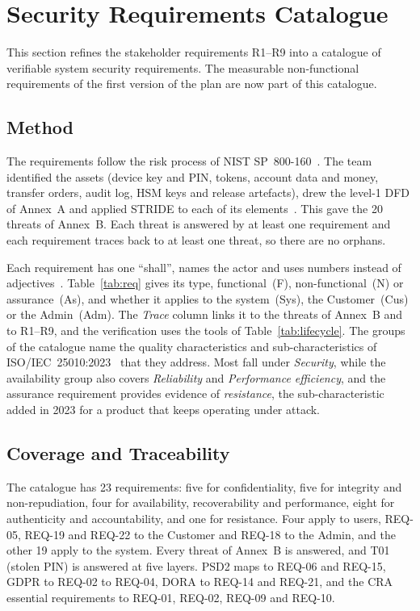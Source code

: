 \section{Security Requirements Catalogue}
\label{sec:catalogue}

This section refines the stakeholder requirements R1--R9 into a catalogue
of verifiable system security requirements. The measurable
non-functional requirements of the first version of the plan are now
part of this catalogue.

\subsection{Method}

The requirements follow the risk process of NIST SP~800-160~\cite{nist800160v1}.
The team identified the assets (device key and \ac{PIN}, tokens, account
data and money, transfer orders, audit log, \ac{HSM} keys and release
artefacts), drew the level-1 \ac{DFD} of Annex~A and applied \ac{STRIDE}
to each of its elements~\cite{shostack2014}. This gave the 20 threats of
Annex~B. Each threat is answered by at least one requirement and each
requirement traces back to at least one threat, so there are no orphans.

Each requirement has one ``shall'', names the actor and uses numbers
instead of adjectives~\cite{hooks1993}. Table~\ref{tab:req} gives its
type, functional~(F), non-functional~(N) or assurance~(As), and whether
it applies to the system~(Sys), the Customer~(Cus) or the Admin~(Adm).
The \emph{Trace} column links it to the threats of Annex~B and to R1--R9,
and the verification uses the tools of Table~\ref{tab:lifecycle}. The
groups of the catalogue name the quality characteristics and
sub-characteristics of ISO/IEC~25010:2023~\cite{iso25010} that they
address. Most fall under \emph{Security}, while the availability group
also covers \emph{Reliability} and \emph{Performance efficiency}, and the
assurance requirement provides evidence of \emph{resistance}, the
sub-characteristic added in 2023 for a product that keeps operating
under attack.

\subsection{Coverage and Traceability}

The catalogue has 23 requirements: five for confidentiality, five for
integrity and non-repudiation, four for availability, recoverability
and performance, eight for authenticity and accountability, and one
for resistance. Four
apply to users, \mbox{REQ-05}, \mbox{REQ-19} and \mbox{REQ-22} to the Customer and \mbox{REQ-18} to the
Admin, and the other 19 apply to the system. Every threat of Annex~B is
answered, and T01 (stolen \ac{PIN}) is answered at five layers. \ac{PSD2} maps to \mbox{REQ-06} and \mbox{REQ-15}, \ac{GDPR} to \mbox{REQ-02} to
\mbox{REQ-04}, \ac{DORA} to \mbox{REQ-14} and \mbox{REQ-21}, and the \ac{CRA} essential
requirements to \mbox{REQ-01}, \mbox{REQ-02}, \mbox{REQ-09} and \mbox{REQ-10}.

